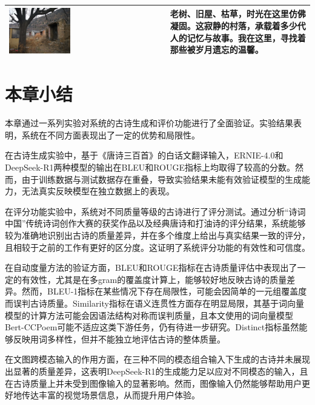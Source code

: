 \begin{longtable}{
  |>{\centering\arraybackslash}m{} %
  |>{\centering\arraybackslash}m{}|   %
}
\hline
\includegraphics[width=0.4\textwidth]{figures/图文测试/6.jpg} & 老树、旧屋、枯草，时光在这里仿佛凝固。这寂静的村落，承载着多少代人的记忆与故事。我在这里，寻找着那些被岁月遗忘的温馨。 \\
\hline

\end{longtable}


\clearpage
\section{本章小结}

本章通过一系列实验对系统的古诗生成和评价功能进行了全面验证。实验结果表明，系统在不同方面表现出了一定的优势和局限性。

在古诗生成实验中，基于《唐诗三百首》的白话文翻译输入，ERNIE-4.0和DeepSeek-R1两种模型的输出在BLEU和ROUGE指标上均取得了较高的分数。然而，由于训练数据与测试数据存在重叠，导致实验结果未能有效验证模型的生成能力，无法真实反映模型在独立数据上的表现。

在评分功能实验中，系统对不同质量等级的古诗进行了评分测试。通过分析“诗词中国”传统诗词创作大赛的获奖作品以及经典唐诗和打油诗的评分结果，系统能够较为准确地识别出古诗的质量差异，并在多个维度上给出与真实结果一致的评分，且相较于之前的工作有更好的区分度。这证明了系统评分功能的有效性和可信度。

在自动度量方法的验证方面，BLEU和ROUGE指标在古诗质量评估中表现出了一定的有效性，尤其是在多gram的覆盖度计算上，能够较好地反映古诗的质量差异。然而，BLEU-1指标在某些情况下存在局限性，可能会因简单的一元组覆盖度而误判古诗质量。Similarity指标在语义连贯性方面存在明显局限，其基于词向量模型的计算方法可能会因语法结构对称而误判质量，且本文使用的词向量模型Bert-CCPoem可能不适应这类下游任务，仍有待进一步研究。Distinct指标虽然能够反映用词多样性，但并不能独立地评估古诗的整体质量。

在文图跨模态输入的作用方面，在三种不同的模态组合输入下生成的古诗并未展现出显著的质量差异，这表明DeepSeek-R1的生成能力足以应对不同模态的输入，且在古诗质量上并未受到图像输入的显著影响。然而，图像输入仍然能够帮助用户更好地传达丰富的视觉场景信息，从而提升用户体验。